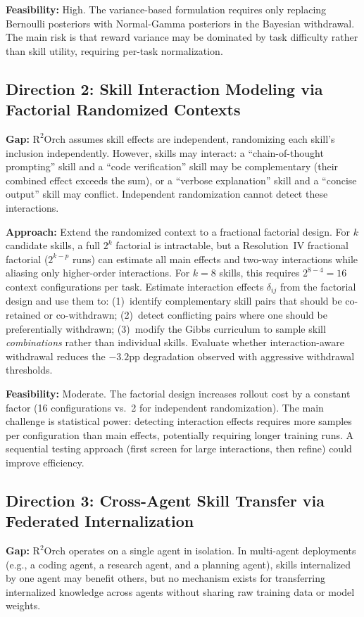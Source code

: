 \documentclass[11pt,a4paper]{article}
\begin{document}
\textbf{Feasibility:} High. The variance-based formulation requires only replacing Bernoulli posteriors with Normal-Gamma posteriors in the Bayesian withdrawal. The main risk is that reward variance may be dominated by task difficulty rather than skill utility, requiring per-task normalization.

\subsection{Direction 2: Skill Interaction Modeling via Factorial Randomized Contexts}
\textbf{Gap:} $\mathrm{R^2Orch}$ assumes skill effects are independent, randomizing each skill's inclusion independently. However, skills may interact: a ``chain-of-thought prompting'' skill and a ``code verification'' skill may be complementary (their combined effect exceeds the sum), or a ``verbose explanation'' skill and a ``concise output'' skill may conflict. Independent randomization cannot detect these interactions.

\textbf{Approach:} Extend the randomized context to a fractional factorial design. For $k$ candidate skills, a full $2^k$ factorial is intractable, but a Resolution~IV fractional factorial ($2^{k-p}$ runs) can estimate all main effects and two-way interactions while aliasing only higher-order interactions. For $k = 8$ skills, this requires $2^{8-4} = 16$ context configurations per task. Estimate interaction effects $\delta_{ij}$ from the factorial design and use them to: (1)~identify complementary skill pairs that should be co-retained or co-withdrawn; (2)~detect conflicting pairs where one should be preferentially withdrawn; (3)~modify the Gibbs curriculum to sample skill \emph{combinations} rather than individual skills. Evaluate whether interaction-aware withdrawal reduces the $-3.2$pp degradation observed with aggressive withdrawal thresholds.

\textbf{Feasibility:} Moderate. The factorial design increases rollout cost by a constant factor (16 configurations vs.\ 2 for independent randomization). The main challenge is statistical power: detecting interaction effects requires more samples per configuration than main effects, potentially requiring longer training runs. A sequential testing approach (first screen for large interactions, then refine) could improve efficiency.

\subsection{Direction 3: Cross-Agent Skill Transfer via Federated Internalization}
\textbf{Gap:} $\mathrm{R^2Orch}$ operates on a single agent in isolation. In multi-agent deployments (e.g., a coding agent, a research agent, and a planning agent), skills internalized by one agent may benefit others, but no mechanism exists for transferring internalized knowledge across agents without sharing raw training data or model weights.
\end{document}
